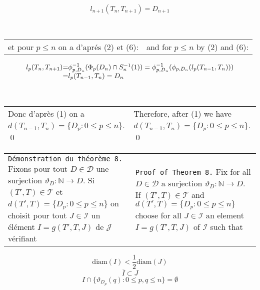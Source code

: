 \documentclass[12pt]{article}
\theoremstyle{plain}
\theoremstyle{definition}
\theoremstyle{remark}
\begin{document}
\[l_{n+1}(T_n,T_{n+1})=D_{n+1}\]

\

\begin{tabular}{p{2.8in} p{2.8in}}

et pour $p\leq n$ on a d'apr\'es (2) et (6):

&

and for $p \leq n$ by (2) and (6):

\end{tabular}

\[
\begin{array}{r@{=}l}
l_p(T_n,T_{n+1})
&
\phi_{p,D_n}^{-1}(\Phi_p(D_n) \cap S_n^{-1}(1)) = \phi_{p,D_n}^{-1}(\phi_{p,D_n}(l_p(T_{n-1},T_n)))
\\ &
l_p(T_{n-1},T_n) = D_n
\end{array}
\]

\

\begin{tabular}{p{2.8in} p{2.8in}}

Donc d'apr\`es (1) on a $d(T_{n-1},T_n) = \{D_p : 0 \leq p \leq n\}$. \qed

&

Therefore, after (1) we have $d(T_{n-1},T_n) = \{D_p : 0 \leq p \leq n\}$. \qed

\end{tabular}

\begin{tabular}{p{2.8in} p{2.8in}}

\texttt{D\'emonstration du th\'eor\`eme 8.} Fixons pour tout $D \in \mathcal{D}$ une surjection $\vartheta_D: \mathbb{N} \to D$. Si $(T',T) \in \mathcal{T}$ et $d(T',T) = \{D_p : 0 \leq p \leq n\}$ on choisit pour tout $J \in \mathcal{I}$ un \'el\'ement $I = g(T',T,J)$ de $\mathcal{J}$ v\'erifiant

&

\texttt{Proof of Theorem 8.} Fix for all $D \in \mathcal{D}$ a surjection $\vartheta_D: \mathbb{N} \to D$. If $(T',T) \in \mathcal{T}$ and $d(T',T) = \{D_p : 0 \leq p \leq n\}$ choose for all $J \in \mathcal{I}$ an element $I = g(T',T,J)$ of $\mathcal{I}$ such that

\end{tabular}

\setcounter{equation}{0}
\begin{equation}
\mathrm{diam}(I) < \frac{1}{2}\mathrm{diam}(J)
\end{equation}
\begin{equation}
\overline{I} \subset J
\end{equation}
\begin{equation}
I \cap \{\vartheta_{D_p}(q) : 0 \leq p,q \leq n\} = \emptyset
\end{equation}
\end{document}
